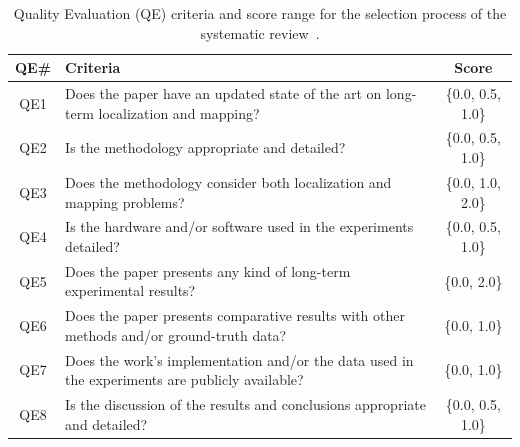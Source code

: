 \begin{table}[t]
  \caption[Quality Evaluation (QE) criteria and score range for the selection process of the systematic review]{Quality Evaluation (QE) criteria and score range for the selection process of the systematic review~\cite{sousa:jfr:2023}.}
  \label{tab:literature:systematic:method:quality-assessment}
  \centering
  \begin{tabular}{c m{} c}

\hline
\textbf{QE\#} & \textbf{Criteria} & \textbf{Score}\\
\hline
QE1 &
Does the paper have an updated state of the art on long-term localization and mapping? &
\{0.0, 0.5, 1.0\}\\
\hline
QE2 &
Is the methodology appropriate and detailed? &
\{0.0, 0.5, 1.0\}\\
\hline
QE3 &
Does the methodology consider both localization and mapping problems? &
\{0.0, 1.0, 2.0\}\\
\hline
QE4 &
Is the hardware and/or software used in the experiments detailed? &
\{0.0, 0.5, 1.0\}\\
\hline
QE5 &
Does the paper presents any kind of long-term experimental results? &
\{0.0, 2.0\}\\
\hline
QE6 &
Does the paper presents comparative results with other methods and/or ground-truth data? &
\{0.0, 1.0\}\\
\hline
QE7 &
Does the work's implementation and/or the data used in the experiments are publicly available? &
\{0.0, 1.0\}\\
\hline
QE8 &
Is the discussion of the results and conclusions appropriate and detailed? &
\{0.0, 0.5, 1.0\}\\
\hline

  \end{tabular}
\end{table}
